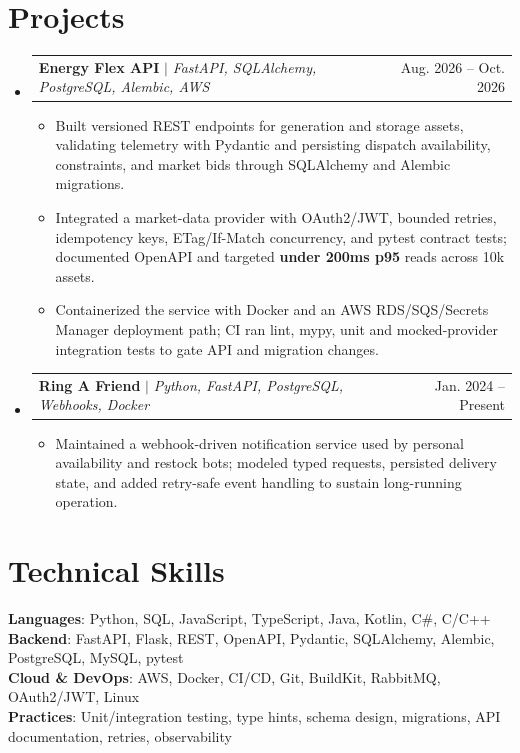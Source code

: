 \documentclass[letterpaper,11pt]{article}
\makeatletter
\newcommand{\resumeItem}[1]{
  \item\small{
    {#1 \vspace{-2pt}}
  }
}
\newcommand{\resumeProjectHeading}[2]{
    \item
    \begin{tabular*}{0.97\textwidth}{l@{\extracolsep{\fill}}r}
      \small#1 & #2 \\
    \end{tabular*}\vspace{-7pt}
}
\newcommand{\resumeSubHeadingListStart}{\begin{itemize}[leftmargin=0.15in, label={}]}
\newcommand{\resumeSubHeadingListEnd}{\end{itemize}}
\newcommand{\resumeItemListStart}{\begin{itemize}}
\newcommand{\resumeItemListEnd}{\end{itemize}\vspace{-5pt}}
\makeatother
\begin{document}
\section{Projects}
\resumeSubHeadingListStart
\resumeProjectHeading
{\textbf{Energy Flex API} $|$ \emph{FastAPI, SQLAlchemy, PostgreSQL, Alembic, AWS}}{Aug. 2026 -- Oct. 2026}
\resumeItemListStart
\resumeItem{Built versioned REST endpoints for generation and storage assets, validating telemetry with Pydantic and persisting dispatch availability, constraints, and market bids through SQLAlchemy and Alembic migrations.}
\resumeItem{Integrated a market-data provider with OAuth2/JWT, bounded retries, idempotency keys, ETag/If-Match concurrency, and pytest contract tests; documented OpenAPI and targeted \textbf{under 200ms p95} reads across 10k assets.}
\resumeItem{Containerized the service with Docker and an AWS RDS/SQS/Secrets Manager deployment path; CI ran lint, mypy, unit and mocked-provider integration tests to gate API and migration changes.}
\resumeItemListEnd
\resumeProjectHeading
{\textbf{Ring A Friend} $|$ \emph{Python, FastAPI, PostgreSQL, Webhooks, Docker}}{Jan. 2024 -- Present}
\resumeItemListStart
\resumeItem{Maintained a webhook-driven notification service used by personal availability and restock bots; modeled typed requests, persisted delivery state, and added retry-safe event handling to sustain long-running operation.}
\resumeItemListEnd
\resumeSubHeadingListEnd

\section{Technical Skills}
\begin{itemize}[leftmargin=0.15in, label={}]
  \small{\item{
        \textbf{Languages}{: Python, SQL, JavaScript, TypeScript, Java, Kotlin, C\#, C/C++} \\
        \textbf{Backend}{: FastAPI, Flask, REST, OpenAPI, Pydantic, SQLAlchemy, Alembic, PostgreSQL, MySQL, pytest} \\
        \textbf{Cloud \& DevOps}{: AWS, Docker, CI/CD, Git, BuildKit, RabbitMQ, OAuth2/JWT, Linux} \\
        \textbf{Practices}{: Unit/integration testing, type hints, schema design, migrations, API documentation, retries, observability}
        }}
\end{itemize}

\end{document}
